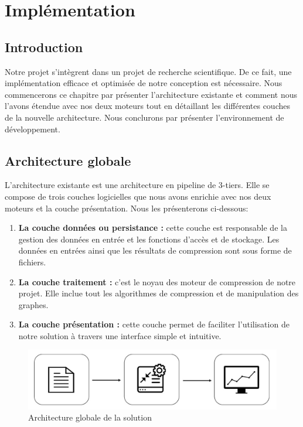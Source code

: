 \chapter{Implémentation}
	\section{Introduction}
	
	Notre projet s'intègrent dans un projet de recherche scientifique. De ce fait, une implémentation efficace et optimisée de notre conception est nécessaire. Nous commencerons ce chapitre par présenter l'architecture existante et comment nous l'avons étendue avec nos deux moteurs tout en détaillant les différentes couches de la nouvelle architecture. Nous conclurons par présenter l'environnement de développement.
	
	
	\section{Architecture globale}
	
	L'architecture existante est une architecture en pipeline de 3-tiers. Elle se compose de trois couches logicielles que nous avons enrichie avec nos deux moteurs et la couche présentation. Nous les présenterons ci-dessous:
	
	\begin{enumerate}
	\item \textbf{La couche données ou persistance :} cette couche est responsable de la gestion des données en entrée et les fonctions d'accès et de stockage. Les données en entrées ainsi que les résultats de compression sont sous forme de fichiers.
	
	\item \textbf{La couche traitement :} c'est le noyau des moteur de compression de notre projet. Elle inclue tout les algorithmes de compression et de manipulation des graphes. 
	\item \textbf{La couche présentation :} cette couche permet de faciliter l'utilisation de notre solution à travers une interface simple et intuitive.
	\end{enumerate}
	
	
	
\begin{figure}[H]
	\centering
	\label{Img:archglob}
	\includegraphics[scale=0.35]{ressources/image/ArchGlob.jpg}
	\caption{Architecture globale de la solution}

 \end{figure}
	
